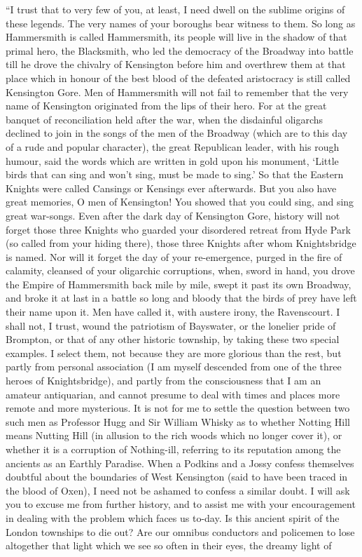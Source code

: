 \documentclass{book}
\begin{document}
“I trust that to very few of you, at least, I need dwell on the sublime origins of these legends. The very names of your boroughs bear witness to them. So long as Hammersmith is called Hammersmith, its people will live in the shadow of that primal hero, the Blacksmith, who led the democracy of the Broadway into battle till he drove the chivalry of Kensington before him and overthrew them at that place which in honour of the best blood of the defeated aristocracy is still called Kensington Gore. Men of Hammersmith will not fail to remember that the very name of Kensington originated from the lips of their hero. For at the great banquet of reconciliation held after the war, when the disdainful oligarchs declined to join in the songs of the men of the Broadway (which are to this day of a rude and popular character), the great Republican leader, with his rough humour, said the words which are written in gold upon his monument, ‘Little birds that can sing and won’t sing, must be made to sing.’ So that the Eastern Knights were called Cansings or Kensings ever afterwards. But you also have great memories, O men of Kensington! You showed that you could sing, and sing great war-songs. Even after the dark day of Kensington Gore, history will not forget those three Knights who guarded your disordered retreat from Hyde Park (so called from your hiding there), those three Knights after whom Knightsbridge is named. Nor will it forget the day of your re-emergence, purged in the fire of calamity, cleansed of your oligarchic corruptions, when, sword in hand, you drove the Empire of Hammersmith back mile by mile, swept it past its own Broadway, and broke it at last in a battle so long and bloody that the birds of prey have left their name upon it. Men have called it, with austere irony, the Ravenscourt. I shall not, I trust, wound the patriotism of Bayswater, or the lonelier pride of Brompton, or that of any other historic township, by taking these two special examples. I select them, not because they are more glorious than the rest, but partly from personal association (I am myself descended from one of the three heroes of Knightsbridge), and partly from the consciousness that I am an amateur antiquarian, and cannot presume to deal with times and places more remote and more mysterious. It is not for me to settle the question between two such men as Professor Hugg and Sir William Whisky as to whether Notting Hill means Nutting Hill (in allusion to the rich woods which no longer cover it), or whether it is a corruption of Nothing-ill, referring to its reputation among the ancients as an Earthly Paradise. When a Podkins and a Jossy confess themselves doubtful about the boundaries of West Kensington (said to have been traced in the blood of Oxen), I need not be ashamed to confess a similar doubt. I will ask you to excuse me from further history, and to assist me with your encouragement in dealing with the problem which faces us to-day. Is this ancient spirit of the London townships to die out? Are our omnibus conductors and policemen to lose altogether that light which we see so often in their eyes, the dreamy light of
\end{document}
